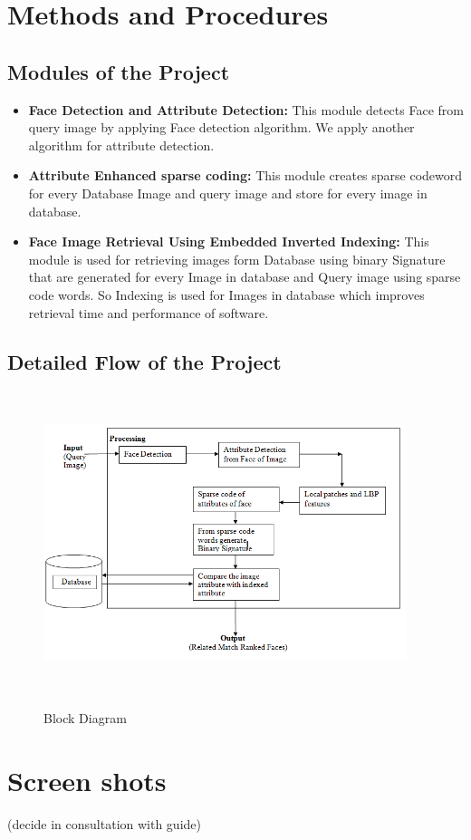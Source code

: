 \section{\normalsize{\textbf{Methods and Procedures}}}
\subsection{\normalsize{\textbf{Modules of the Project}}}
\begin{itemize}
\item \textbf{Face Detection and Attribute Detection:}\newline
This module detects Face from query image by applying Face detection algorithm. We apply another algorithm for attribute detection.
\end{itemize}
\begin{itemize}
\item \textbf{Attribute Enhanced sparse coding:}\newline
This module creates sparse codeword for every Database Image and query image and store for every image in database.
\end{itemize}
\begin{itemize}
\item \textbf{Face Image Retrieval Using Embedded Inverted Indexing:}\newline
This module is used for retrieving images form Database using binary Signature that are generated for every Image in database and Query image using sparse code words. So Indexing is used for Images in database which improves retrieval time and performance of software.
\end{itemize}
\subsection{\normalsize{\textbf{Detailed Flow of the Project}}}
\begin{figure}[ht!]
	\centering
\includegraphics[height=250pt,width=300pt]{block1.png}\\
\caption{Block Diagram}
\end{figure}

\section{\normalsize{\textbf{Screen shots}}}
(decide in consultation with guide)
